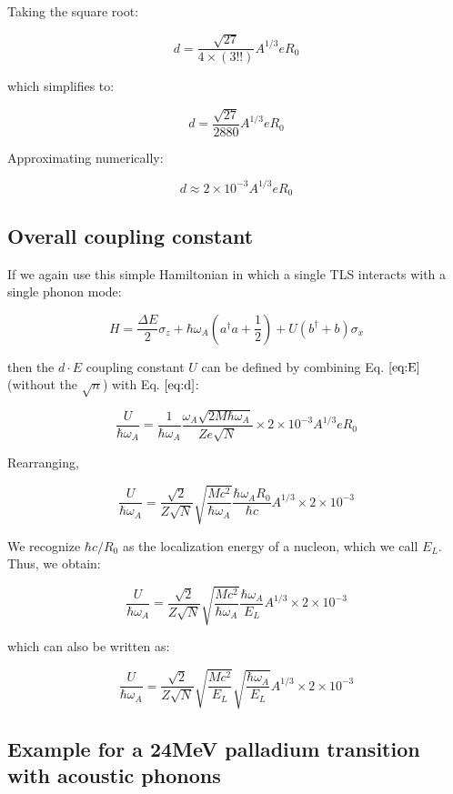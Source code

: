 \documentclass[
]{article}
\renewcommand{\[}{\begin{equation}}
\renewcommand{\]}{\end{equation}}
\begin{document}
Taking the square root:

\[
d = \frac{\sqrt{27}}{4 \times (3!!)} A^{1/3} e R_0
\]

which simplifies to:

\[
d = \frac{\sqrt{27}}{2880} A^{1/3} e R_0
\]

Approximating numerically:

\[
d \approx 2 \times 10^{-3} A^{1/3} e R_0 \label{eq:d}
\]

\subsection{Overall coupling
constant}\label{overall-coupling-constant-1}

If we again use this simple Hamiltonian in which a single TLS interacts
with a single phonon mode:

\[
H = \frac{\Delta E}{2} \sigma_z + \hbar\omega_A\left(a^{\dagger}a +\frac{1}{2}\right) + U\left( b^{\dagger} + b \right)\sigma_x
\]

then the \(d \cdot E\) coupling constant \(U\) can be defined by
combining Eq. \(\ref{eq:E}\) (without the \(\sqrt{n}\)) with Eq.
\(\ref{eq:d}\):

\[
\frac{U}{\hbar \omega_A} = \frac{1}{\hbar \omega_A} \frac{\omega_A \sqrt{2M \hbar \omega_A}}{Ze \sqrt{N}} \times 2 \times 10^{-3} A^{1/3} e R_0
\]

Rearranging,

\[
\frac{U}{\hbar \omega_A} = \frac{\sqrt{2}}{Z \sqrt{N}} \sqrt{\frac{M c^2}{\hbar \omega_A}} \frac{\hbar \omega_A R_0}{\hbar c} A^{1/3} \times 2 \times 10^{-3}
\]

We recognize \(\hbar c / R_0\) as the localization energy of a nucleon,
which we call \(E_L\). Thus, we obtain:

\[
\frac{U}{\hbar \omega_A} = \frac{\sqrt{2}}{Z \sqrt{N}} \sqrt{\frac{M c^2}{\hbar \omega_A}} \frac{\hbar \omega_A}{E_L} A^{1/3} \times 2 \times 10^{-3}
\]

which can also be written as:

\[
\frac{U}{\hbar \omega_A} = \frac{\sqrt{2}}{Z \sqrt{N}} \sqrt{\frac{M c^2}{E_L}} \sqrt{\frac{\hbar \omega_A}{E_L}} A^{1/3} \times 2 \times 10^{-3}
\]

\subsection{Example for a 24MeV palladium transition with acoustic
phonons}\label{example-for-a-24mev-palladium-transition-with-acoustic-phonons-1}
\end{document}
